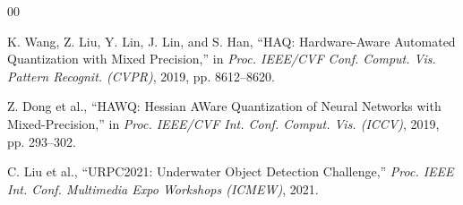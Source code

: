 \documentclass[journal]{IEEEtran}
\begin{document}
\begin{thebibliography}{00}

K. Wang, Z. Liu, Y. Lin, J. Lin, and S. Han, ``HAQ: Hardware-Aware Automated Quantization with Mixed Precision,'' in \textit{Proc. IEEE/CVF Conf. Comput. Vis. Pattern Recognit. (CVPR)}, 2019, pp. 8612--8620.

Z. Dong et al., ``HAWQ: Hessian AWare Quantization of Neural Networks with Mixed-Precision,'' in \textit{Proc. IEEE/CVF Int. Conf. Comput. Vis. (ICCV)}, 2019, pp. 293--302.

C. Liu et al., ``URPC2021: Underwater Object Detection Challenge,'' \textit{Proc. IEEE Int. Conf. Multimedia Expo Workshops (ICMEW)}, 2021.

\end{thebibliography}
\end{document}
